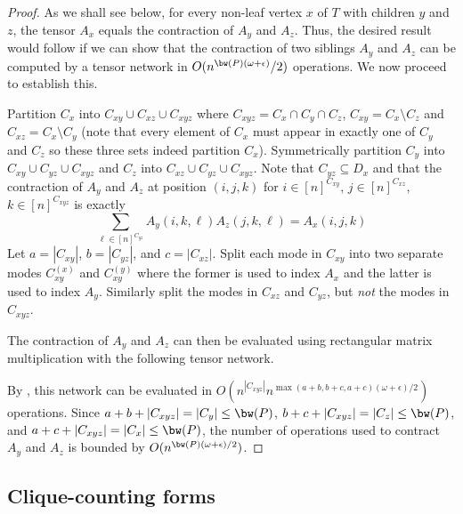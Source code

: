 \begin{proof}
  As we shall see below, for every non-leaf vertex $x$ of $T$ with
  children $y$ and $z$, the tensor $A_x$ equals the contraction of
  $A_y$ and $A_z$.
  Thus, the desired result would follow if we can show that the
  contraction of two siblings $A_y$ and $A_z$ can be computed by a
  tensor network in $O(n^{\bw(P) (\omega+\epsilon)}/2)$ operations.  We
  now proceed to establish this.




    Partition $C_x$ into $C_{xy} \cup C_{xz} \cup C_{xyz}$ where
    $C_{xyz} = C_x \cap C_y \cap C_z$, $C_{xy} = C_x \setminus C_z$
    and $C_{xz} = C_x \setminus C_y$ (note that every element of $C_x$
    must appear in exactly one of $C_y$ and $C_z$ so these three sets
    indeed partition $C_x$).  Symmetrically partition $C_y$ into
    $C_{xy} \cup C_{yz} \cup C_{xyz}$ and $C_z$ into
    $C_{xz} \cup C_{yz} \cup C_{xyz}$.  
    Note that $C_{yz} \subseteq D_x$ and that the contraction of $A_y$ and $A_z$ at position $(i,j,k)$ for $i \in [n]^{C_{xy}}$, $j \in [n]^{C_{xz}}$, $k \in [n]^{C_{xyz}}$ is exactly
    \[
    \sum_{\ell \in [n]^{C_{yz}}} A_y(i,k,\ell) A_z(j,k,\ell) =  A_x(i,j,k)
    \]
    Let $a = |C_{xy}|$, $b = |C_{yz}|$, and $c = |C_{xz}|$.  Split
    each mode in $C_{xy}$ into two separate modes $C_{xy}^{(x)}$ and
    $C_{xy}^{(y)}$ where the former is used to index $A_x$ and the
    latter is used to index $A_y$.  Similarly split the modes in $C_{xz}$ and
    $C_{yz}$, but \emph{not} the modes in $C_{xyz}$.

    The contraction of $A_y$ and $A_z$ can then be evaluated using
    rectangular matrix multiplication with the following tensor
    network.

    By , this network can be
    evaluated in
    $O(n^{|C_{xyz}|} n^{\max(a+b, b+c, a+c) (\omega+\epsilon)/2})$
    operations.  Since $a + b + |C_{xyz}| = |C_y| \le \bw(P)$,
    $b+c + |C_{xyz}| = |C_z| \le \bw(P)$, and
    $a+c + |C_{xyz}| = |C_x| \le \bw(P)$, the number of operations used to
    contract $A_y$ and $A_z$ is bounded by
    $O(n^{\bw(P) (\omega+\epsilon)/2})$.
\end{proof}



\subsection{Clique-counting forms}

